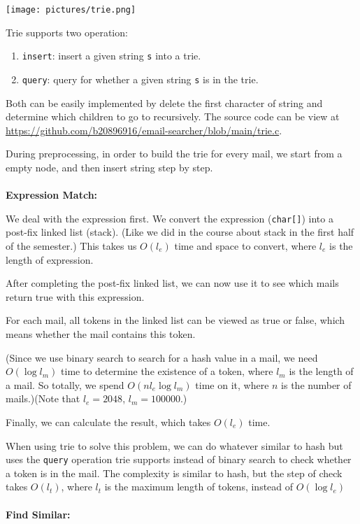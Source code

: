 \documentclass{article}
\begin{document}
\begin{center}
    \texttt{[image: pictures/trie.png]}
\end{center}

Trie supports two operation:

\begin{enumerate}
    \item \verb|insert|: insert a given string \verb|s| into a trie.
    \item \verb|query|: query for whether a given string \verb|s| is in the trie.
\end{enumerate}

Both can be easily implemented by delete the first character of string and determine which children to go to recursively. The source code can be view at \url{https://github.com/b20896916/email-searcher/blob/main/trie.c}.

During preprocessing, in order to build the trie for every mail, we start from a empty node, and then insert string step by step.\\ \\
\textbf{Expression Match:}

We deal with the expression first. We convert the expression (\verb|char[]|) into a post-fix linked list (stack). (Like we did in the course about stack in the first half of the semester.)
This takes us $O(l_e)$ time and space to convert, where $l_e$ is the length of expression.

After completing the post-fix linked list, we can now use it to see which mails return true with this expression.

For each mail, all tokens in the linked list can be viewed as true or false, which means whether the mail contains this token.

(Since we use binary search to search for a hash value in a mail, we need $O(\log l_m)$ time to determine the existence of a token, where $l_m$ is the length of a mail. So totally, we spend $O(n l_e \log l_m)$ time on it, where $n$ is the number of mails.)(Note that $l_e = 2048$, $l_m = 100000$.)

Finally, we can calculate the result, which takes $O(l_e)$ time.

When using trie to solve this problem, we can do whatever similar to hash but uses the \verb|query| operation trie supports instead of binary search to check whether a token is in the mail. The complexity is similar to hash, but the step of check takes $O(l_t)$, where $l_t$ is the maximum length of tokens, instead of $O(\log l_e)$\\ \\
\textbf{Find Similar:}
\end{document}

